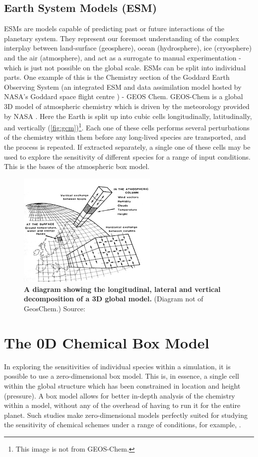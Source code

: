 \subsection{Earth System Models (ESM)}
  ESMs are models capable of predicting past or future interactions of the planetary system. They represent our foremost understanding of the complex interplay between land-surface (geosphere), ocean (hydrosphere), ice (cryosphere) and the air (atmosphere), and act as a surrogate to manual experimentation -  which is just not possible on the global scale.
ESMs can be split into individual parts. One example of this is the Chemistry section of the Goddard Earth Observing System (an integrated ESM and data assimilation model hosted by NASA's Goddard space flight centre \citep{geosgit}) - GEOS Chem. GEOS-Chem is a global 3D model of atmospheric chemistry which is driven by the meteorology provided by NASA \citep{geos}. Here the Earth is split up into cubic cells longitudinally, latitudinally, and vertically (\autoref{fig:gcm})\footnote{This image is not from GEOS-Chem.}. Each one of these cells performs several perturbations of the chemistry within them before any long-lived species are transported, and the process is repeated. If extracted separately, a single one of these cells may be used to explore the sensitivity of different species for a range of input conditions. This is the bases of the atmospheric box model.
\begin{figure}
  \centering
  \includegraphics[width=0.6\textwidth]{gcm.jpg}
  \caption{\textbf{A diagram showing the longitudinal, lateral and vertical decomposition of a 3D global model.} (Diagram not of GeosChem.) Source: \citep{gcm}}
  \label{fig:gcm}
\end{figure}
\section{The 0D Chemical Box Model}
In exploring the sensitivities of individual species within a simulation, it is possible to use a zero-dimensional box model. This is, in essence, a single cell within the global structure which has been constrained in location and height (pressure). A box model allows for better in-depth analysis of the chemistry within a model, without any of the overhead of having to run it for the entire planet. Such studies make zero-dimensional models perfectly suited for studying the sensitivity of chemical schemes under a range of conditions, for example, \citep{dsmacc}.


